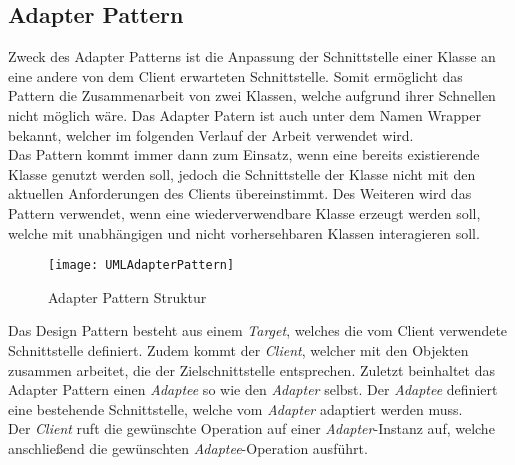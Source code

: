 \subsection{Adapter Pattern}
Zweck des Adapter Patterns ist die Anpassung der Schnittstelle einer Klasse an eine andere von dem Client erwarteten Schnittstelle. Somit ermöglicht das Pattern die Zusammenarbeit von zwei Klassen, welche aufgrund ihrer Schnellen nicht möglich wäre. Das Adapter Patern ist auch unter dem Namen Wrapper bekannt, welcher im folgenden Verlauf der Arbeit verwendet wird.\\
Das Pattern kommt immer dann zum Einsatz, wenn eine bereits existierende Klasse genutzt werden soll, jedoch die Schnittstelle der Klasse nicht mit den aktuellen Anforderungen des Clients übereinstimmt. Des Weiteren wird das Pattern verwendet, wenn eine wiederverwendbare Klasse erzeugt werden soll, welche mit unabhängigen und nicht vorhersehbaren Klassen interagieren soll.\\      
\begin{center}
    \begin{figure}[h]
     \centering
     \texttt{[image: UMLAdapterPattern]}
     \caption{Adapter Pattern Struktur \cite{DesignPatterns}}
    \label{fig:AdapterPattern}
    \end{figure}
\end{center}
\vspace{-2cm}
Das Design Pattern besteht aus einem \textit{Target}, welches die vom Client verwendete Schnittstelle definiert. Zudem kommt der \textit{Client}, welcher mit den Objekten zusammen arbeitet, die der Zielschnittstelle entsprechen. Zuletzt beinhaltet das Adapter Pattern einen \textit{Adaptee} so wie den \textit{Adapter} selbst. Der \textit{Adaptee} definiert eine bestehende Schnittstelle, welche vom \textit{Adapter} adaptiert werden muss.\\ 
Der \textit{Client} ruft die gewünschte Operation auf einer \textit{Adapter}-Instanz auf, welche anschließend die gewünschten \textit{Adaptee}-Operation ausführt.

